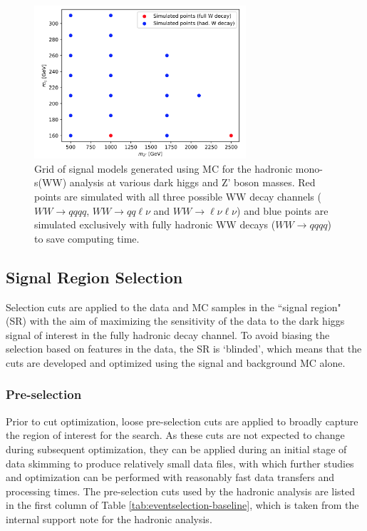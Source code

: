 \documentclass[12pt]{article}
\begin{document}
 \begin{figure}[H]
	\centering
	\includegraphics[width=0.7\textwidth]{figures/had_grid.png}
	\caption[]{Grid of signal models generated using MC for the hadronic mono-s(WW) analysis at various dark higgs and Z' boson masses. Red points are simulated with all three possible WW decay channels ($WW \rightarrow qqqq$, $WW \rightarrow qq\ell\nu$ and $WW \rightarrow \ell\nu\ell\nu$) and blue points are simulated exclusively with fully hadronic WW decays ($WW \rightarrow qqqq$) to save computing time.}
	\label{fig:had_grid} 
\end{figure}

\subsection{Signal Region Selection}

Selection cuts are applied to the data and MC samples in the ``signal region" (SR) with the aim of maximizing the sensitivity of the data to the dark higgs signal of interest in the fully hadronic decay channel. To avoid biasing the selection based on features in the data, the SR is `blinded', which means that the cuts are developed and optimized using the signal and background MC alone.

\subsubsection{Pre-selection}

Prior to cut optimization, loose pre-selection cuts are applied to broadly capture the region of interest for the search. As these cuts are not expected to change during subsequent optimization, they can be applied during an initial stage of data skimming to produce relatively small data files, with which further studies and optimization can be performed with reasonably fast data transfers and processing times. The pre-selection cuts used by the hadronic analysis are listed in the first column of Table \ref{tab:eventselection-baseline}, which is taken from the internal support note for the hadronic analysis. 
\end{document}
